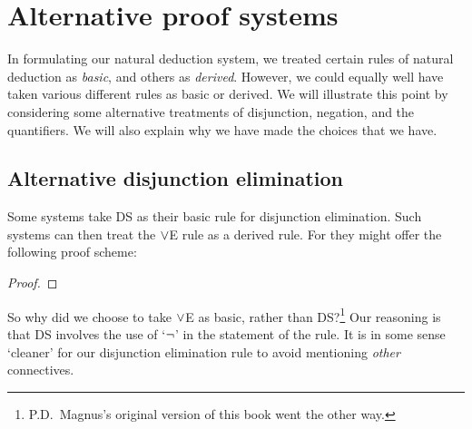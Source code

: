 
\chapter{Alternative proof systems}
In formulating our natural deduction system, we treated certain rules of natural deduction as \emph{basic}, and others as \emph{derived}. However, we could equally well have taken various different rules as basic or derived. We will illustrate this point by considering some alternative treatments of disjunction, negation, and the quantifiers. We will also explain why we have made the choices that we have.


\section{Alternative disjunction elimination}
Some systems take DS as their basic rule for disjunction elimination. Such systems can then treat the $\vee$E rule as a derived rule. For they might offer the following proof scheme: 
	\begin{proof}
		\open
			 {}
		\close
		\open
		\close
		\open
		\close
		\open
		\open
		\close
	\close
\end{proof}
So why did we choose to take $\vee$E as basic, rather than DS?\footnote{P.D.\ Magnus's original version of this book went the other way.} Our reasoning is that DS involves the use of `$\neg$' in the statement of the rule. It is in some sense `cleaner' for our disjunction elimination rule to avoid mentioning \emph{other} connectives. 


